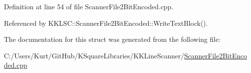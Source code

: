 Definition at line 54 of file Scanner\+File2\+Bit\+Encoded.\+cpp.



Referenced by K\+K\+L\+S\+C\+::\+Scanner\+File2\+Bit\+Encoded\+::\+Write\+Text\+Block().



The documentation for this struct was generated from the following file\+:\begin{DoxyCompactItemize}
\item 
C\+:/\+Users/\+Kurt/\+Git\+Hub/\+K\+Square\+Libraries/\+K\+K\+Line\+Scanner/\hyperlink{_scanner_file2_bit_encoded_8cpp}{Scanner\+File2\+Bit\+Encoded.\+cpp}\end{DoxyCompactItemize}
